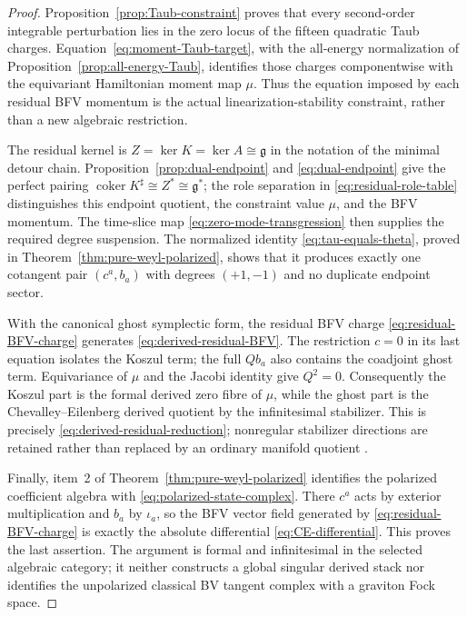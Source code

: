 \documentclass[11pt]{article}
\theoremstyle{definition}
\theoremstyle{remark}
\newcommand{\g}{\mathfrak g}
\begin{document}
\begin{proof}
Proposition~\ref{prop:Taub-constraint} proves that every second-order
integrable perturbation lies in the zero locus of the fifteen quadratic Taub
charges.  Equation~\eqref{eq:moment-Taub-target}, with the all-energy
normalization of Proposition~\ref{prop:all-energy-Taub}, identifies those
charges componentwise with the equivariant Hamiltonian moment map $\mu$.
Thus the equation imposed by each residual BFV momentum is the actual
linearization-stability constraint, rather than a new algebraic restriction.

The residual kernel is $Z=\ker K=\ker A\cong\g$ in the notation of the
minimal detour chain.  Proposition~\ref{prop:dual-endpoint}
and \eqref{eq:dual-endpoint} give the perfect pairing
$\operatorname{coker}K^\sharp\cong Z^*\cong\g^*$; the role separation in
\eqref{eq:residual-role-table} distinguishes this endpoint quotient, the
constraint value $\mu$, and the BFV momentum.  The time-slice map
\eqref{eq:zero-mode-transgression} then supplies the required degree
suspension.  The normalized identity \eqref{eq:tau-equals-theta}, proved in
Theorem~\ref{thm:pure-weyl-polarized}, shows that it produces exactly one
cotangent pair $(c^a,b_a)$ with degrees $(+1,-1)$ and no duplicate endpoint
sector.

With the canonical ghost symplectic form, the residual BFV charge
\eqref{eq:residual-BFV-charge} generates \eqref{eq:derived-residual-BFV}.
The restriction $c=0$ in its last equation isolates the Koszul term; the
full $Qb_a$ also contains the coadjoint ghost term.  Equivariance of $\mu$
and the Jacobi identity give $Q^2=0$.  Consequently the Koszul part is the
formal derived zero fibre of $\mu$, while the ghost part is the
Chevalley--Eilenberg derived quotient by the infinitesimal stabilizer.  This
is precisely \eqref{eq:derived-residual-reduction}; nonregular stabilizer
directions are retained rather than replaced by an ordinary manifold
quotient \cite{CattaneoMnevReshetikhin}.

Finally, item~2 of Theorem~\ref{thm:pure-weyl-polarized} identifies the
polarized coefficient algebra with
\eqref{eq:polarized-state-complex}.  There $c^a$ acts by exterior
multiplication and $b_a$ by $\iota_a$, so the BFV vector field generated by
\eqref{eq:residual-BFV-charge} is exactly the absolute differential
\eqref{eq:CE-differential}.  This proves the last assertion.  The argument
is formal and infinitesimal in the selected algebraic category; it neither
constructs a global singular derived stack nor identifies the unpolarized
classical BV tangent complex with a graviton Fock space.
\end{proof}
\end{document}
